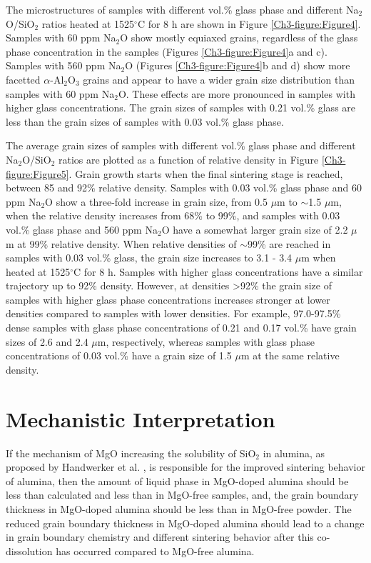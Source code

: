 The microstructures of samples with different vol.\% glass phase and different Na$_{2}$O/SiO$_{2}$ ratios heated at 1525$^{\circ}$C for 8 h are shown in Figure \ref{Ch3-figure:Figure4}. Samples with 60 ppm Na$_{2}$O show mostly equiaxed grains, regardless of the glass phase concentration in the samples (Figures \ref{Ch3-figure:Figure4}a and c). Samples with 560 ppm Na$_{2}$O (Figures  \ref{Ch3-figure:Figure4}b and d) show more facetted $\alpha$-Al$_{2}$O$_{3}$ grains and appear to have a wider grain size distribution than samples with 60 ppm Na$_{2}$O. These effects are more pronounced in samples with higher glass concentrations. The grain sizes of samples with 0.21 vol.\% glass are less than the grain sizes of samples with 0.03 vol.\% glass phase. 

The average grain sizes of samples with different vol.\% glass phase and different Na$_{2}$O/SiO$_{2}$ ratios are plotted as a function of relative density in Figure \ref{Ch3-figure:Figure5}. Grain growth starts when the final sintering stage is reached, between 85 and 92\% relative density. Samples with 0.03 vol.\% glass phase and 60 ppm Na$_{2}$O show a three-fold increase in grain size, from 0.5 $\mu$m to $\sim$1.5 $\mu$m, when the relative density increases from 68\% to 99\%, and samples with 0.03 vol.\% glass phase and 560 ppm Na$_{2}$O have a somewhat larger grain size of 2.2 $\mu$m at 99\% relative density. When relative densities of $\sim$99\% are reached in samples with 0.03 vol.\% glass, the grain size increases to 3.1 - 3.4 $\mu$m when heated at 1525$^{\circ}$C for 8 h. Samples with higher glass concentrations have a similar trajectory up to 92\% density. However, at densities >92\% the grain size of samples with higher glass phase concentrations increases stronger at lower densities compared to samples with lower densities. For example, 97.0-97.5\% dense samples with glass phase concentrations of 0.21 and 0.17 vol.\% have grain sizes of 2.6 and 2.4 $\mu$m, respectively, whereas samples with glass phase concentrations of 0.03 vol.\% have a grain size of 1.5 $\mu$m at the same relative density.
 
\section{Mechanistic Interpretation}

If the mechanism of MgO increasing the solubility of SiO$_{2}$ in alumina, as proposed by Handwerker et al. \cite{Handwerker1989}, is responsible for the improved sintering behavior of alumina, then the amount of liquid phase in MgO-doped alumina should be less than calculated and less than in MgO-free samples, and, the grain boundary thickness in MgO-doped alumina should be less than in MgO-free powder. The reduced grain boundary thickness in MgO-doped alumina should lead to a change in grain boundary chemistry and different sintering behavior after this co-dissolution has occurred compared to MgO-free alumina. 

